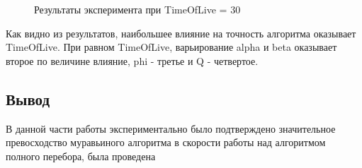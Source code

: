 \documentclass{article}
\begin{document}
\begin{figure}[H]
		 	\caption{Результаты эксперимента при TimeOfLive = 30}
		 	\label{testTOL30}
	 	\end{figure}

\indent Как видно из результатов, наибольшее влияние на точность алгоритма оказывает TimeOfLive. При равном TimeOfLive, варьирование alpha и beta оказывает второе по величине влияние, phi - третье и Q - четвертое.
	\subsection{Вывод}
	В данной части работы экспериментально было подтверждено значительное превосходство муравьиного алгоритма в скорости работы над алгоритмом полного перебора, была проведена 
\end{document}
